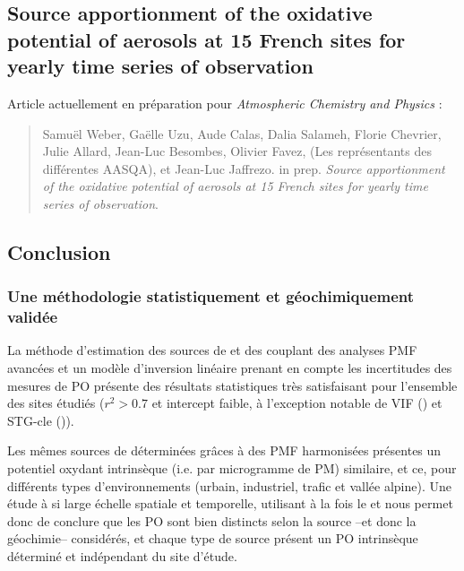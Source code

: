 \subsection{Source apportionment of the oxidative potential of aerosols at 15 French
sites for yearly time series of observation}%
\label{sub:article}

\begin{tcolorbox}[colback=red!5!white,colframe=Melon,title=Note]
Article actuellement en préparation pour \textit{Atmospheric Chemistry and Physics} :
\begin{quote}
    Samuël Weber, Gaëlle Uzu, Aude Calas, Dalia Salameh, Florie Chevrier, Julie Allard,
    Jean-Luc Besombes, Olivier Favez, (Les représentants des différentes AASQA), et
    Jean-Luc Jaffrezo. in prep.
    \textit{Source apportionment of the oxidative potential of aerosols at 15 French
    sites for yearly time series of observation}.
\end{quote}
\end{tcolorbox}

\clearpage


\subsection{Conclusion}%
\label{sec:conclusion_synthèse_OP}

\subsubsection{Une méthodologie statistiquement et géochimiquement validée}%
\label{ssub:une_méthodologie_statistiquement_et_géochimiquement_validée}

La méthode d'estimation des sources de \POAA{} et \PODTT{} des \PMdix{} couplant des
analyses PMF avancées et un modèle d'inversion linéaire prenant en compte les incertitudes
des mesures de PO présente des résultats statistiques très satisfaisant pour l'ensemble
des sites étudiés ($r^2>0.7$ et intercept faible, à l'exception notable de VIF (\PODTT) et
STG-cle (\POAA)).

Les mêmes sources de \PMdix{} déterminées grâces à des PMF harmonisées présentes un potentiel
oxydant intrinsèque (i.e. par microgramme de PM) similaire, et ce, pour différents types
d'environnements (urbain, industriel, trafic et vallée alpine). Une étude à si large
échelle spatiale et temporelle, utilisant à la fois le \POAA{} et \PODTT{} nous permet
donc de conclure que les PO sont bien distincts selon la source --et donc la géochimie--
considérés, et chaque type de source présent un PO intrinsèque déterminé et indépendant du
site d'étude.

